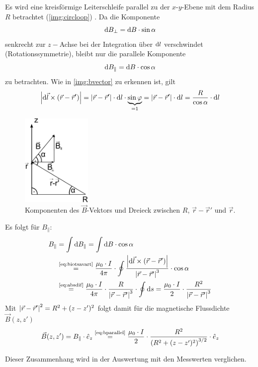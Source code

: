 Es wird eine kreisförmige Leiterschleife parallel zu der $x$-$y$-Ebene
mit dem Radius $R$ betrachtet (\autoref{img:circloop}) \cite{dem2}.
Da die Komponente
\begin{equation}
\label{}
\mathrm{d} B_\perp = \mathrm{d} B \cdot \sin \alpha
\end{equation}
senkrecht zur $z-$Achse bei der Integration über $\mathrm{d} l$ verschwindet 
(Rotationssymmetrie), bleibt nur die parallele Komponente
\begin{equation}
\label{}
\mathrm{d} B_\parallel = \mathrm{d} B \cdot \cos \alpha
\end{equation}
zu betrachten. Wie in 
\autoref{img:bvector} zu erkennen ist, gilt
\begin{equation}
\label{eq:absdif}
  \left|\mathrm{d} \vec{l} \times \left( \vec{r} - \vec{r}' \right)\right| = \left|\vec{r} - \vec{r}'\right| \cdot \mathrm{d} l \cdot \underbrace{\sin \varphi}_{= 1} 
  = \left|\vec{r} - \vec{r}'\right| \cdot \mathrm{d} l = \frac{R}{\cos \alpha} \cdot \mathrm{d} l
\end{equation}
\begin{figure}[H]
\begin{center}
  \includegraphics[width=0.3\textwidth]{../img/bvector.pdf}
  \caption{Komponenten des $\vec{B}$-Vektors und Dreieck zwischen $R$, $\vec{r}-\vec{r}'$ und $\vec{r}$.}
  \label{img:bvector}
\end{center}
\end{figure}
Es folgt für $B_\parallel$:
\begin{equation}
\begin{split}
  \label{eq:bparallel}
    B_\parallel &= \int \difd B_\parallel = \int \difd B \cdot \cos \alpha \\
  &\refeq{eq:biotsavart} \frac{\mu_0 \cdot I}{4 \pi} \cdot \oint \frac{\abs{\difd \vec{l} \times \left( \vec{r} - \vec{r}' \right)}}{\abs{\vec{r} - \vec{r}'}^3} \cdot \cos \alpha \\
  &\refeq{eq:absdif} \frac{\mu_0 \cdot I}{4 \pi} \cdot \frac{R}{\abs{\vec{r} - \vec{r}'}^3} \cdot \oint \difd s = \frac{\mu_0 \cdot I}{2} \cdot \frac{R^2}{\abs{\vec{r} - \vec{r}'}^3}
\end{split}
\end{equation}
Mit $\left|\vec{r} - \vec{r}'\right|^2 = R^2 + (z-z')^2$ folgt damit für die magnetische Flussdichte $\vec{B}(z, z')$
\begin{equation}
  \vec{B}(z, z') = B_\parallel \cdot \hat{e}_z \refeq{eq:bparallel} \frac{\mu_0 \cdot I}{2} \cdot \frac{R^2}{ \left( R^2 + (z-z')^2 \right)^{3/2}} \cdot \hat{e}_z
\end{equation}

Dieser Zusammenhang wird in der Auswertung mit den Messwerten verglichen.
